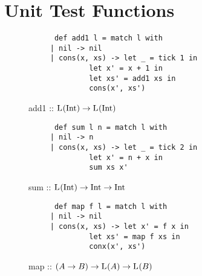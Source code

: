 \chapter{Unit Test Functions}

\begin{figure}[H]
   \begin{verbatim}
      def add1 l = match l with 
	 | nil -> nil
	 | cons(x, xs) -> let _ = tick 1 in 
			  let x' = x + 1 in
			  let xs' = add1 xs in
			  cons(x', xs')
   \end{verbatim}
   \caption{add1 :: \(\text{L}^{}(\text{Int}) \to \text{L}^{}(\text{Int})\)}
\label{fig:code-add1}
\end{figure}

\begin{figure}[H]
   \begin{verbatim}
      def sum l n = match l with 
	 | nil -> n
	 | cons(x, xs) -> let _ = tick 2 in 
			  let x' = n + x in
			  sum xs x'
   \end{verbatim}
   \caption{sum :: \(\text{L}^{}(\text{Int}) \to \text{Int} \to \text{Int}\)}
\label{fig:code-sum}
\end{figure}

\begin{figure}[H]
   \begin{verbatim}
      def map f l = match l with
	 | nil -> nil
	 | cons(x, xs) -> let x' = f x in
			  let xs' = map f xs in
			  conx(x', xs')
   \end{verbatim}
   \caption{map :: \((A \to B) \to \text{L}^{}(A) \to \text{L}^{}(B)\)}
\label{fig:code-map}
\end{figure}

